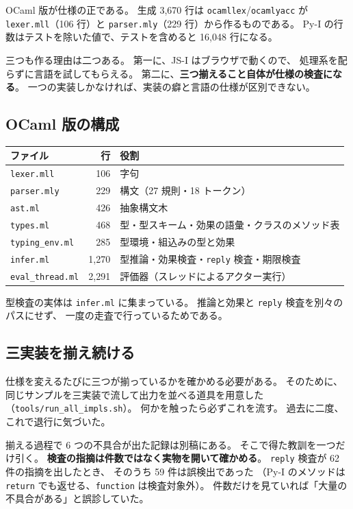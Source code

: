 \documentclass[11pt,a4paper]{ltjsarticle}
\theoremstyle{definition}
\theoremstyle{remark}
\begin{document}
OCaml 版が仕様の正である。
生成 3,670 行は \texttt{ocamllex}/\texttt{ocamlyacc} が
\texttt{lexer.mll}（106 行）と \texttt{parser.mly}（229 行）から作るものである。
Py-I の行数はテストを除いた値で、テストを含めると 16,048 行になる。

三つも作る理由は二つある。
第一に、JS-I はブラウザで動くので、
処理系を配らずに言語を試してもらえる。
第二に、\textbf{三つ揃えること自体が仕様の検査になる}。
一つの実装しかなければ、実装の癖と言語の仕様が区別できない。

\subsection{OCaml 版の構成}

\begin{center}
\begin{tabular}{lrl}
\toprule
ファイル & 行 & 役割 \\
\midrule
\texttt{lexer.mll}    & 106  & 字句 \\
\texttt{parser.mly}   & 229  & 構文（27 規則・18 トークン） \\
\texttt{ast.ml}       & 426  & 抽象構文木 \\
\texttt{types.ml}     & 468  & 型・型スキーム・効果の語彙・クラスのメソッド表 \\
\texttt{typing\_env.ml} & 285 & 型環境・組込みの型と効果 \\
\texttt{infer.ml}     & 1,270 & 型推論・効果検査・\texttt{reply} 検査・期限検査 \\
\texttt{eval\_thread.ml} & 2,291 & 評価器（スレッドによるアクター実行） \\
\bottomrule
\end{tabular}
\end{center}

型検査の実体は \texttt{infer.ml} に集まっている。
推論と効果と \texttt{reply} 検査を別々のパスにせず、
一度の走査で行っているためである。

\subsection{三実装を揃え続ける}

仕様を変えるたびに三つが揃っているかを確かめる必要がある。
そのために、同じサンプルを三実装で流して出力を並べる道具を用意した
（\texttt{tools/run\_all\_impls.sh}）。
何かを触ったら必ずこれを流す。
過去に二度、これで退行に気づいた。

揃える過程で 6 つの不具合が出た記録は別稿\cite{selfparity}にある。
そこで得た教訓を一つだけ引く。
\textbf{検査の指摘は件数ではなく実物を開いて確かめる}。
\texttt{reply} 検査が 62 件の指摘を出したとき、
そのうち 59 件は誤検出であった
（Py-I のメソッドは \texttt{return} でも返せる、\texttt{function} は検査対象外）。
件数だけを見ていれば「大量の不具合がある」と誤診していた。
\end{document}

